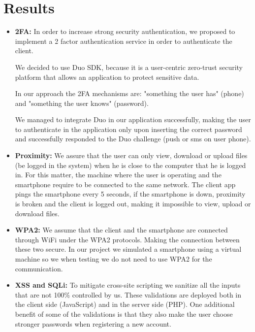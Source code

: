 \documentclass[12pt]{article}
\begin{document}
\newpage
\section{Results}

\begin{itemize}
  \item \textbf{2FA:} 
  In order to increase strong security authentication, we proposed to implement a 2 factor authentication service in order to authenticate the client. 
  
  We decided to use Duo SDK, because it is a user-centric zero-trust security platform that allows an application to protect sensitive data. 
  
  In our approach the 2FA mechanisms are: "something the user has" (phone) and "something the user knows" (password).
  
  We managed to integrate Duo in our application successfully, making the user to authenticate in the application only upon inserting the correct password and successfully responded to the Duo challenge (push or sms on user phone).
  
  \item \textbf{Proximity:}
  We assure that the user can only view, download or upload files (be logged in the system) when he is close to the computer that he is logged in. For this matter, the machine where the user is operating and the smartphone require to be connected to the same network. The client app pings the smartphone every 5 seconds, if the smartphone is down, proximity is broken and the client is logged out, making it impossible to view, upload or download files.
  
  \item \textbf{WPA2:}
  We assume that the client and the smartphone are connected through WiFi under the WPA2 protocols. Making the connection between these two secure.
  In our project we simulated a smartphone using a virtual machine so we when testing we do not need to use WPA2 for the communication.
  
  \item \textbf{XSS and SQLi:} 
  To mitigate cross-site scripting we sanitize all the inputs that are not 100\% controlled by us. These validations are deployed both in the client side (JavaScript) and in the server side (PHP). One additional benefit of some of the validations is that they also make the user choose stronger passwords when registering a new account.


\end{itemize}
\end{document}
